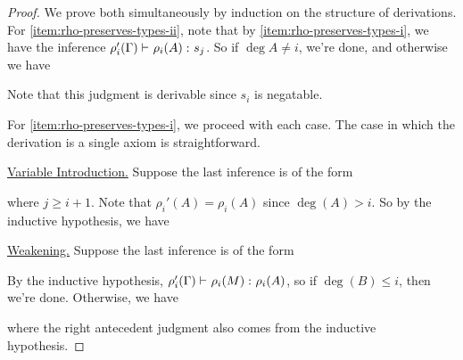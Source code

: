 \documentclass{article}
\begin{document}
\begin{proof}

We prove both simultaneously by induction on the structure of derivations.
For \autoref{item:rho-preserves-types-ii}, note that by \autoref{item:rho-preserves-types-i}, we have the inference
$
    \judgment {
       \rho_i'(\Gamma)
    }{
        \rho_i(A)
    }{
        s_j
    }
$.
So if $\deg A \not = i$, we're done, and otherwise we have
\begin{prooftree}
\end{prooftree}
Note that this judgment is derivable since $s_i$ is negatable.

For \autoref{item:rho-preserves-types-i}, we proceed with each case.
The case in which the derivation is a single axiom is straightforward.

\noindent\underline{Variable Introduction.}
Suppose the last inference is of the form
\begin{prooftree}
\end{prooftree}
where $j \geq i + 1$.
Note that $\rho_i'(A) = \rho_i(A)$ since $\deg(A) > i$.
So by the inductive hypothesis, we have
\begin{prooftree}
\end{prooftree}

\noindent\underline{Weakening.}
Suppose the last inference is of the form
\begin{prooftree}
\end{prooftree}
By the inductive hypothesis,
$
    \judgment {
        \rho_i'(\Gamma)
    }{
        \rho_i(M)
    }{
        \rho_i(A)
    }
$,
so if $\deg(B) \leq i$, then we're done.
Otherwise, we have
\begin{prooftree}
\end{prooftree}
where the right antecedent judgment also comes from the inductive hypothesis.


\end{proof}
\end{document}

